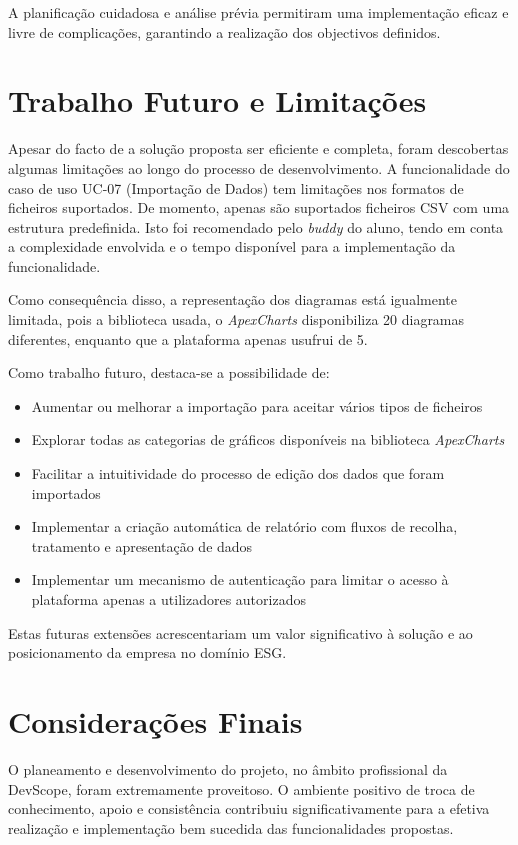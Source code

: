 A planificação cuidadosa e análise prévia permitiram uma implementação eficaz e livre de complicações, garantindo a realização dos objectivos definidos.

\section{Trabalho Futuro e Limitações}

Apesar do facto de a solução proposta ser eficiente e completa, foram descobertas algumas limitações ao longo do processo de desenvolvimento. A funcionalidade do caso de uso UC-07 (Importação de Dados) tem limitações nos formatos de ficheiros suportados. De momento, apenas são suportados ficheiros CSV com uma estrutura predefinida. Isto foi recomendado pelo \textit{buddy} do aluno, tendo em conta a complexidade envolvida e o tempo disponível para a implementação da funcionalidade.

Como consequência disso, a representação dos diagramas está igualmente limitada, pois a biblioteca usada, o \textit{ApexCharts} disponibiliza 20 diagramas diferentes, enquanto que a plataforma apenas usufrui de 5.

Como trabalho futuro, destaca-se a possibilidade de:

\begin{itemize}
\item Aumentar ou melhorar a importação para aceitar vários tipos de ficheiros
\item Explorar todas as categorias de gráficos disponíveis na biblioteca \textit{ApexCharts}
\item Facilitar a intuitividade do processo de edição dos dados que foram importados 
\item Implementar a criação automática de relatório com fluxos de recolha, tratamento e apresentação de dados
\item Implementar um mecanismo de autenticação para limitar o acesso à plataforma apenas a utilizadores autorizados
\end{itemize}

Estas futuras extensões acrescentariam um valor significativo à solução e ao posicionamento da empresa no domínio ESG.

\section{Considerações Finais}

O planeamento e desenvolvimento do projeto, no âmbito profissional da DevScope, foram extremamente proveitoso. O ambiente positivo de troca de conhecimento, apoio e consistência contribuiu significativamente para a efetiva realização e implementação bem sucedida das funcionalidades propostas.

